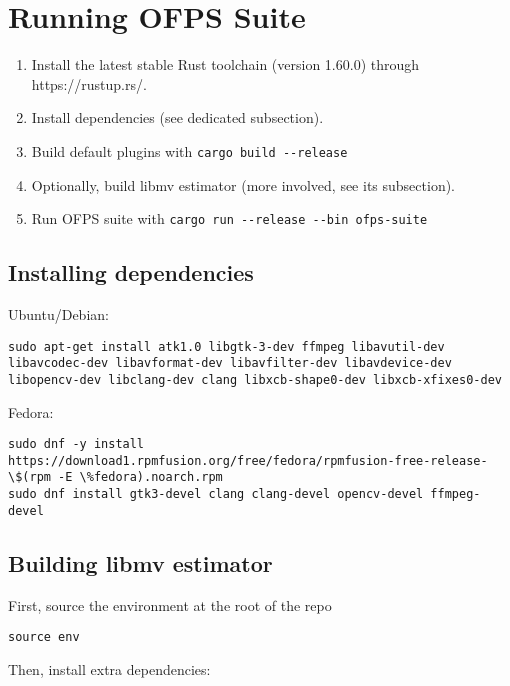 \section*{Running OFPS Suite}

\begin{enumerate}
\def\labelenumi{\arabic{enumi}.}
\item
  Install the latest stable Rust toolchain (version 1.60.0) through
  https://rustup.rs/.
\item
  Install dependencies (see dedicated subsection).
\item
  Build default plugins with \texttt{cargo\ build\ -\/-release}
\item
  Optionally, build libmv estimator (more involved, see its subsection).
\item
  Run OFPS suite with
  \texttt{cargo\ run\ -\/-release\ -\/-bin\ ofps-suite}
\end{enumerate}

\subsection*{Installing dependencies}

Ubuntu/Debian:

\begin{lstlisting}
sudo apt-get install atk1.0 libgtk-3-dev ffmpeg libavutil-dev libavcodec-dev libavformat-dev libavfilter-dev libavdevice-dev libopencv-dev libclang-dev clang libxcb-shape0-dev libxcb-xfixes0-dev
\end{lstlisting}

Fedora:

\begin{lstlisting}
sudo dnf -y install https://download1.rpmfusion.org/free/fedora/rpmfusion-free-release-\$(rpm -E \%fedora).noarch.rpm
sudo dnf install gtk3-devel clang clang-devel opencv-devel ffmpeg-devel
\end{lstlisting}

\subsection*{Building libmv estimator}

First, source the environment at the root of the repo

\begin{lstlisting}
source env
\end{lstlisting}

Then, install extra dependencies:

